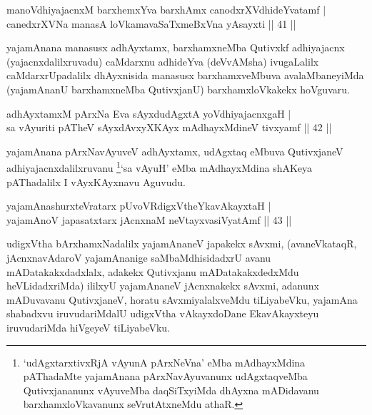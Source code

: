 
\begin{shl}
manoV\s dhiyajacnxM barxhemxYva barxhAmx canodxrXV\s dhideYvatamf |\\
canedxrXVNa manasA loVkamavaSaTxmeBxVna yAsayxti \hfill || 41 || 
\end{shl}

\begin{artha}
yajamAnana manasusx adhAyxtamx, barxhamxneMba Qutivxkf adhiyajacnx (yajacnxdalilxruvadu) caMdarxnu adhideYva (deVvAMsha) ivugaLalilx caMdarxrUpadalilx dhAyxnisida manasusx barxhamxveMbuva avalaMbaneyiMda (yajamAnanU barxhamxneMba QutivxjanU) barxhamxloVkakekx hoVguvaru.
\end{artha}

\begin{shl}
adhAyxtamxM pArxNa Eva sAyxdudAgxtA yoV\s dhiyajacnxgaH |\\
sa vAyuriti pATheV sAyxdAvxyXKAyx mAdhayxMdineV tivxyamf \hfill || 42 ||
\end{shl}

\begin{artha}
yajamAnana pArxNavAyuveV adhAyxtamx, udAgxtaq eMbuva QutivxjaneV adhiyajacnxdalilxruvanu \footnote{`udAgxtarxtivxRjA vAyunA pArxNeVna' eMba mAdhayxMdina pAThadaMte yajamAnana pArxNavAyuvanunx udAgxtaqveMba Qutivxjananunx vAyuveMba daqSiTxyiMda dhAyxna mADidavanu barxhamxloVkavanunx seVrutAtxneMdu athaR.}`sa vAyuH' eMba mAdhayxMdina shAKeya pAThadalilx I vAyxKAyxnavu Aguvudu.
\end{artha}


\begin{shl}
yajamAnashurxteVratarx pUvoVRdigxVtheYkavAkayxtaH |\\
yajamAnoV japasatxtarx jAcnxnaM neVtayxvasiVyatAmf \hfill || 43 ||
\end{shl}

\begin{artha}
udigxVtha bArxhamxNadalilx yajamAnaneV japakekx sAvxmi, (avaneVkataqR, jAcnxnavAdaroV yajamAnanige saMbaMdhisidadxrU avanu mADatakakxdadxlalx, adakekx Qutivxjanu mADatakakxdedxMdu heVLidadxriMda) ililxyU yajamAnaneV jAcnxnakekx sAvxmi, adanunx mADuvavanu QutivxjaneV, horatu sAvxmiyalalxveMdu tiLiyabeVku, yajamAna shabadxvu iruvudariMdalU udigxVtha vAkayxdoDane EkavAkayxteyu iruvudariMda hiVgeyeV tiLiyabeVku.
\end{artha}

